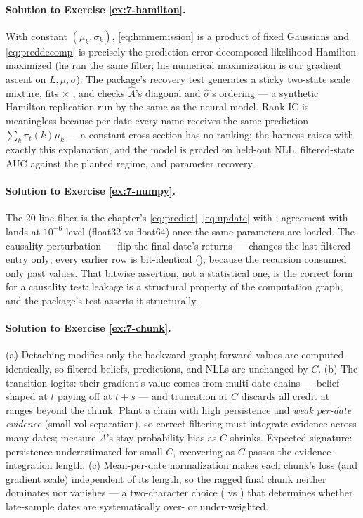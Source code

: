 \paragraph{Solution to Exercise \ref{ex:7-hamilton}.}
With constant $(\mu_k, \sigma_k)$, \eqref{eq:hmmemission} is a product
of fixed Gaussians and \eqref{eq:preddecomp} is precisely the
prediction-error-decomposed likelihood Hamilton maximized (he ran the
same filter; his numerical maximization is our gradient ascent on $L,
\mu, \sigma$). The package's recovery test generates a sticky two-state
scale mixture, fits  $\times$ , and checks
$\hat A$'s diagonal and $\hat\sigma$'s ordering --- a synthetic
Hamilton replication run by the same  as the neural
model. Rank-IC is meaningless because per date every name receives the
same prediction $\sum_k \pi_t(k)\mu_k$ --- a constant cross-section has
no ranking; the harness raises  with exactly this
explanation, and the model is graded on held-out NLL, filtered-state
AUC against the planted regime, and parameter recovery.

\paragraph{Solution to Exercise \ref{ex:7-numpy}.}
The 20-line filter is the chapter's
\eqref{eq:predict}--\eqref{eq:update} with ;
agreement with  lands at $10^{-6}$-level
(float32 vs float64) once the same parameters are loaded. The
causality perturbation --- flip the final date's returns --- changes
the last filtered entry only; every earlier row is bit-identical
(), because the recursion consumed only past
values. That bitwise assertion, not a statistical one, is the correct
form for a causality test: leakage is a structural property of the
computation graph, and the package's test asserts it structurally.

\paragraph{Solution to Exercise \ref{ex:7-chunk}.}
(a) Detaching modifies only the backward graph; forward values are
computed identically, so filtered beliefs, predictions, and NLLs are
unchanged by $C$. (b) The transition logits: their gradient's value
comes from multi-date chains --- belief shaped at $t$ paying off at
$t + s$ --- and truncation at $C$ discards all credit at ranges beyond
the chunk. Plant a chain with high persistence and \emph{weak per-date
evidence} (small vol separation), so correct filtering must integrate
evidence across many dates; measure $\hat A$'s stay-probability bias as
$C$ shrinks. Expected signature: persistence underestimated for small
$C$, recovering as $C$ passes the evidence-integration length.
(c) Mean-per-date normalization makes each chunk's loss (and gradient
scale) independent of its length, so the ragged final chunk neither
dominates nor vanishes --- a two-character choice ( vs
) that determines whether late-sample dates are
systematically over- or under-weighted.

